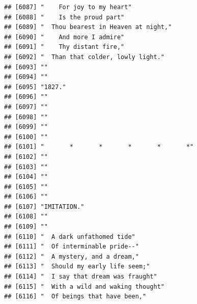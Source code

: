 \documentclass{article}\usepackage[]{graphicx}\usepackage[]{color}
\makeatletter
\newenvironment{kframe}{%
 \def\at@end@of@kframe{}%
 \ifinner\ifhmode%
  \def\at@end@of@kframe{\end{minipage}}%
  \begin{minipage}{\columnwidth}%
 \fi\fi%
 \def\FrameCommand##1{\hskip\@totalleftmargin \hskip-\fboxsep
 \colorbox{shadecolor}{##1}\hskip-\fboxsep
     \hskip-\linewidth \hskip-\@totalleftmargin \hskip\columnwidth}%
 \MakeFramed {\advance\hsize-\width
   \@totalleftmargin\z@ \linewidth\hsize
   \@setminipage}}%
 {\par\unskip\endMakeFramed%
 \at@end@of@kframe}
\newenvironment{knitrout}{}{} %
\makeatother
\begin{document}
\begin{knitrout}
\begin{kframe}
\begin{verbatim}
## [6087] "    For joy to my heart"                                                     
## [6088] "    Is the proud part"                                                       
## [6089] "  Thou bearest in Heaven at night,"                                          
## [6090] "    And more I admire"                                                       
## [6091] "    Thy distant fire,"                                                       
## [6092] "  Than that colder, lowly light."                                            
## [6093] ""                                                                            
## [6094] ""                                                                            
## [6095] "1827."                                                                       
## [6096] ""                                                                            
## [6097] ""                                                                            
## [6098] ""                                                                            
## [6099] ""                                                                            
## [6100] ""                                                                            
## [6101] "       *       *       *       *       *"                                    
## [6102] ""                                                                            
## [6103] ""                                                                            
## [6104] ""                                                                            
## [6105] ""                                                                            
## [6106] ""                                                                            
## [6107] "IMITATION."                                                                  
## [6108] ""                                                                            
## [6109] ""                                                                            
## [6110] "  A dark unfathomed tide"                                                    
## [6111] "  Of interminable pride--"                                                   
## [6112] "  A mystery, and a dream,"                                                   
## [6113] "  Should my early life seem;"                                                
## [6114] "  I say that dream was fraught"                                              
## [6115] "  With a wild and waking thought"                                            
## [6116] "  Of beings that have been,"                                                 

\end{verbatim}
\end{kframe}
\end{knitrout}
\end{document}
